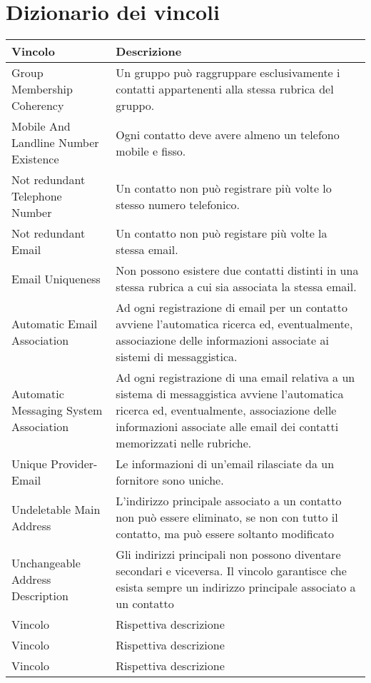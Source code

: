 \section{Dizionario dei vincoli}
\begin{longtable}{p{}p{}}
\toprule
Vincolo & Descrizione
\\ \midrule
Group Membership Coherency &
Un gruppo può raggruppare esclusivamente i contatti appartenenti alla stessa rubrica del gruppo.
\\ \midrule
Mobile And Landline Number Existence & 
Ogni contatto deve avere almeno un telefono mobile e fisso. 
\\ \midrule
Not redundant Telephone Number & 
Un contatto non può registrare più volte lo stesso numero telefonico.
\\ \midrule
Not redundant Email & 
Un contatto non può registare più volte la stessa email. 
\\ \midrule
Email Uniqueness & 
Non possono esistere due contatti distinti in una stessa rubrica a cui sia associata la stessa email. 
\\ \midrule
Automatic Email Association & 
Ad ogni registrazione di email per un contatto avviene l'automatica ricerca ed, eventualmente, associazione delle informazioni associate ai sistemi di messaggistica. 
\\ \midrule
Automatic Messaging System Association & 
Ad ogni registrazione di una email relativa a un sistema di messaggistica avviene l'automatica ricerca ed, eventualmente, associazione delle informazioni associate alle email dei contatti memorizzati nelle rubriche. 
\\ \midrule
Unique Provider-Email & 
Le informazioni di un'email rilasciate da un fornitore sono uniche. 
\\ \midrule
Undeletable Main Address & 
L'indirizzo principale associato a un contatto non può essere eliminato, se non con tutto il contatto, ma può essere soltanto modificato
\\ \midrule
Unchangeable Address Description  & 
Gli indirizzi principali non possono diventare secondari e viceversa. Il vincolo garantisce che esista sempre un indirizzo principale associato a un contatto
\\ \midrule
Vincolo & 
Rispettiva descrizione
\\ \midrule
Vincolo & 
Rispettiva descrizione
\\ \midrule
Vincolo & 
Rispettiva descrizione
\\ \bottomrule
\endhead
\end{longtable}